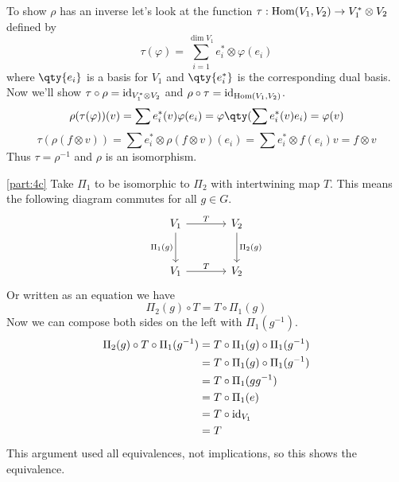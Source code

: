 \documentclass[
	pages,
	boxes,
	color=WildStrawberry
]{homework}
\begin{document}
\begin{solution}
	To show $\rho$ has an inverse let's look at the function $\tau: \operatorname{Hom}(V_1, V_2)\to V_1^*\otimes V_2$ defined by
	\begin{equation*}
		\tau(\varphi) = \sum_{i = 1}^{\dim V_1}e_i^*\otimes \varphi(e_i)
	\end{equation*}
	where $\qty{e_i}$ is a basis for $V_1$ and $\qty{e_i^*}$ is the corresponding dual basis. Now we'll show $\tau \circ \rho = \operatorname{id}_{V_1^*\otimes V_2}$ and $\rho\circ\tau = \operatorname{id}_{\operatorname{Hom}(V_1, V_2)}$.
	\begin{equation*}
		\rho(\tau(\varphi))(v) = \sum e_i^*(v)\varphi(e_i) = \varphi\qty(\sum e_i^*(v)e_i) = \varphi(v)
	\end{equation*}
	\begin{equation*}
		\tau(\rho(f\otimes v)) = \sum e_i^*\otimes \rho(f\otimes v)(e_i) = \sum e_i^*\otimes f(e_i)v = f\otimes v
	\end{equation*}
	Thus $\tau = \rho^{-1}$ and $\rho$ is an isomorphism.


	\ref{part:4c}
	Take $\Pi_1$ to be isomorphic to $\Pi_2$ with intertwining map $T$. This means the following diagram commutes for all $g\in G$.
	\begin{equation*}
		\begin{tikzcd}[row sep=large, column sep=large]
			V_1 \arrow{r}{T} \arrow[swap]{d}{\Pi_1(g)} & V_2 \arrow{d}{\Pi_2(g)} \\
			V_1 \arrow{r}{T} & V_2
		\end{tikzcd}
	\end{equation*}
	Or written as an equation we have
	\begin{equation*}
		\Pi_2(g)\circ T = T \circ \Pi_1(g)
	\end{equation*}
	Now we can compose both sides on the left with $\Pi_1(g^{-1})$.
	\begin{align*}
		\Pi_2(g)\circ T \circ \Pi_1(g^{-1}) & = T \circ \Pi_1(g) \circ \Pi_1(g^{-1}) \\
		                                    & = T \circ \Pi_1(g) \circ \Pi_1(g^{-1}) \\
		                                    & = T \circ \Pi_1(gg^{-1})               \\
		                                    & = T \circ \Pi_1(e)                     \\
		                                    & = T \circ \operatorname{id}_{V_1}                    \\
		                                    & = T
	\end{align*}
	This argument used all equivalences, not implications, so this shows the equivalence.
\end{solution}
\end{document}
